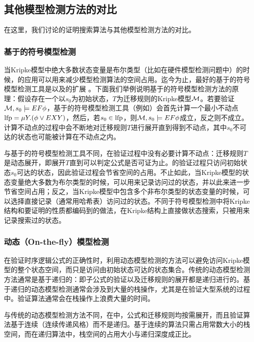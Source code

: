 \subsection{其他\CTLP{}模型检测方法的对比}
在这里，我们讨论\sctlprov{}的证明搜索算法与其他\CTLP{}模型检测方法的对比。

\subsubsection{基于\BDD{}的符号模型检测}
当Kripke模型中绝大多数状态变量是布尔类型（比如在硬件模型检测问题中）的时候，\BDD{}的应用可以用来减少模型检测算法的空间占用。迄今为止，最好的基于\BDD{}的符号模型检测工具是\nusmv{}\cite{mcmillan93,CimattiCGR99}以及\nusmv{}的扩展\nuxmv{} \cite{CAVCDGMMMRT14}。下面我们举例说明基于\BDD{}的符号模型检测方法的原理：假设存在一个以$s_0$为初始状态，$T$为迁移规则的Kripke模型$\cal M$。若要验证${\cal M},s_0\models EF\phi$，基于\BDD{}的符号模型检测工具（例如\nusmv{}）会首先计算一个最小不动点$\textup{lfp}=\mu Y. (\phi\vee EXY)$，然后，若$s_0\in \textup{lfp}$，则${\cal M},s_0\models EF\phi$成立，反之则不成立。计算不动点的过程中会不断地对迁移规则$T$进行展开直到得到不动点，其中$s_0$不可达的状态也可能被计算在不动点之内。

与基于\BDD{}的符号模型检测工具不同，\sctlprov{}在验证过程中没有必要计算不动点：迁移规则$T$是动态展开，即展开$T$直到可以判定公式是否可证为止。\sctlprov{}的验证过程只访问初始状态$s_0$可达的状态，因此验证过程会节省空间的占用。不止如此，当Kripke模型的状态变量绝大多数为布尔类型的时候，\sctlprov{}可以用\BDD{}来记录访问过的状态，并以此来进一步节省空间占用；反之，当Kripke模型中包含多个非布尔类型的状态变量的时候，\sctlprov{}可以选择直接记录（通常用哈希表）访问过的状态。不同于符号模型检测中将Kripke结构和要证明的性质都编码到\BDD{}的做法，\sctlprov{}在Kripke结构上直接做状态搜索，\BDD{}只被用来记录搜索过的状态。

\subsubsection{动态（On-the-fly）模型检测}
在验证时序逻辑公式的正确性时，利用动态模型检测的方法可以避免访问Kripke模型的整个状态空间，而只是访问由初始状态可达的状态集合。传统的\CTL{}动态模型检测方法\cite{VergauwenL93,BCG95}通常是基于递归的：即子公式的验证以及迁移规则的展开都是递归进行的。基于递归的\CTL{}动态模型检测通常会涉及到大量的栈操作，尤其是在验证大型系统的过程中。验证算法通常会在栈操作上浪费大量的时间。

与传统的\CTL{}动态模型检测方法不同，在\sctlprov{}中，公式和迁移规则均按需展开，而且验证算法基于连续（连续传递风格）而不是递归。基于连续的算法只需占用常数大小的栈空间\cite{Reynolds93,Appel06,Sestoft12}，而在递归算法中，栈空间的占用大小与递归深度成正比。

